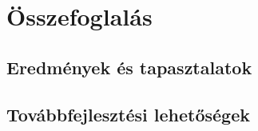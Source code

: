 \chapter{Összefoglalás}
\label{chapt:summary}

\section{Eredmények és tapasztalatok}

\section{Továbbfejlesztési lehetőségek}

